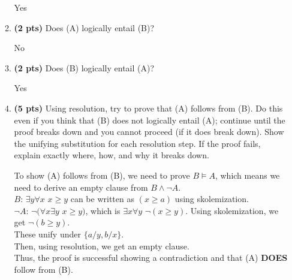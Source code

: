 \documentclass{article}
\begin{document}
\begin{enumerate}
\begin{enumerate}[label=($\alph*$)]
    \color{blue}
        Yes
    \color{black}



    \item \textbf{(2 pts)} Does (A) logically entail (B)?

    \color{blue}
        No
    \color{black}



    \item \textbf{(2 pts)} Does (B) logically entail (A)?

    \color{blue}
        Yes
    \color{black}



    \item \textbf{(5 pts)} Using resolution, try to prove that (A) follows from (B). Do this even if you think that (B) does not logically entail (A); continue until the proof breaks down and you cannot proceed (if it does break down). Show the unifying substitution for each resolution step. If the proof fails, explain exactly where, how, and why it breaks down.

    \color{blue}
        To show (A) follows from (B), we need to prove $B \models A$, which means we need to derive an empty clause from $B \wedge \neg A$.\\
        $B$: $\exists y \forall x$ $x \geq y$ can be written as $(x \geq a)$ using skolemization.\\
        $\neg A$: $\neg (\forall x \exists y$ $x \geq y)$, which is $\exists x \forall y$ $\neg(x \geq y)$. Using skolemization, we get $\neg (b \geq y)$.\\
        These unify under $\{a/y, b/x\}$.\\
        Then, using resolution, we get an empty clause.\\
        Thus, the proof is successful showing a contradiction and that (A) \textbf{DOES }follow from (B).
    \color{black}


\end{enumerate}
\end{enumerate}
\end{document}
